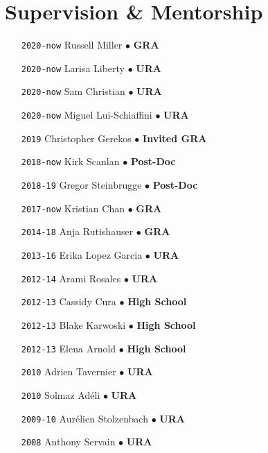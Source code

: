 \section*{Supervision \& Mentorship}

\begin{itemize}[leftmargin=5.8em, labelsep=1.5em]
\setlength\itemsep{-.5em}
    \item[\texttt{2020-now}] Russell Miller $\bullet$ \textbf{GRA}
    \item[\texttt{2020-now}] Larisa Liberty $\bullet$ \textbf{URA}
    \item[\texttt{2020-now}] Sam Christian $\bullet$ \textbf{URA}
    \item[\texttt{2020-now}] Miguel Lui-Schiaffini $\bullet$ \textbf{URA}
    \item[\texttt{2019}] Christopher Gerekos $\bullet$ \textbf{Invited GRA}
    \item[\texttt{2018-now}] Kirk Scanlan $\bullet$ \textbf{Post-Doc}
    \item[\texttt{2018-19}] Gregor Steinbrugge $\bullet$ \textbf{Post-Doc}
    \item[\texttt{2017-now}] Kristian Chan $\bullet$ \textbf{GRA}
    \item[\texttt{2014-18}] Anja Rutishauser $\bullet$ \textbf{GRA}
    \item[\texttt{2013-16}] Erika Lopez Garcia $\bullet$ \textbf{URA}
    \item[\texttt{2012-14}] Arami Rosales $\bullet$ \textbf{URA}
    \item[\texttt{2012-13}] Cassidy Cura $\bullet$ \textbf{High School}
    \item[\texttt{2012-13}] Blake Karwoski $\bullet$ \textbf{High School}
    \item[\texttt{2012-13}] Elena Arnold $\bullet$ \textbf{High School}
    \item[\texttt{2010}] Adrien Tavernier $\bullet$ \textbf{URA}
    \item[\texttt{2010}] Solmaz Adéli $\bullet$ \textbf{URA}
    \item[\texttt{2009-10}] Aurélien Stolzenbach $\bullet$ \textbf{URA}
    \item[\texttt{2008}] Anthony Servain $\bullet$ \textbf{URA}
\end{itemize}
